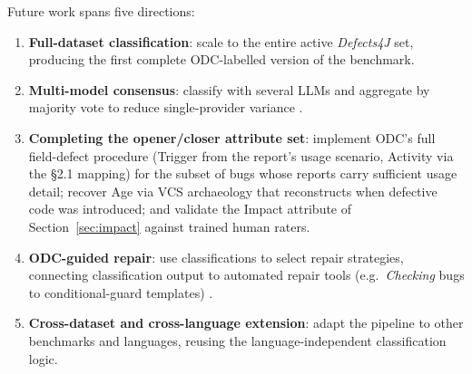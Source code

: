 \smallskip
Future work spans five directions:
\begin{enumerate}
  \item \textbf{Full-dataset classification}: scale to the entire active
        \textit{Defects4J} set, producing the first complete ODC-labelled version
        of the benchmark.
  \item \textbf{Multi-model consensus}: classify with several LLMs and
        aggregate by majority vote to reduce single-provider variance
        \citep{colavito2024llm}.
  \item \textbf{Completing the opener/closer attribute set}: implement
        ODC's full field-defect procedure (Trigger from the report's usage
        scenario, Activity via the \S2.1 mapping) for the subset of bugs whose
        reports carry sufficient usage detail; recover Age via VCS archaeology
        that reconstructs when defective code was introduced; and validate the
        Impact attribute of Section~\ref{sec:impact} against trained human
        raters.
  \item \textbf{ODC-guided repair}: use classifications to select repair
        strategies, connecting classification output to automated repair tools
        (e.g.\ \textit{Checking} bugs to conditional-guard templates)
        \citep{durieux2018automatic}.
  \item \textbf{Cross-dataset and cross-language extension}: adapt the pipeline
        to other benchmarks and languages, reusing the language-independent
        classification logic.
\end{enumerate}

